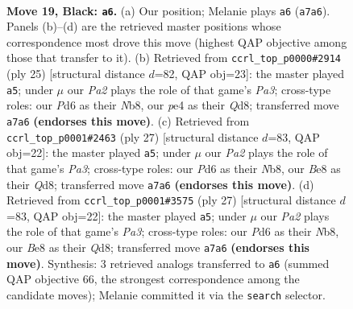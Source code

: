 \documentclass[11pt]{article}
\begin{document}
\clearpage

\begin{figure}[p]\centering
\begin{subfigure}{0.46\textwidth}\centering
\resizebox{\linewidth}{!}{%
\newchessgame
\chessboard[
  setfen={rn2b2r/ppq2kbp/3pp1p1/4p1Pn/4P3/2N1BP2/PPPK2QP/3RRB2 b - - 0 19},
  showmover=false,
  pgfstyle=straightmove, color=movearrow, markmove={a7-a6}
]}
\caption{}
\end{subfigure}\hfill
\begin{subfigure}{0.46\textwidth}\centering
\resizebox{\linewidth}{!}{%
\newchessgame
\chessboard[
  setfen={rn1q1rk1/1p2bpp1/p2p4/3Ppb1p/8/1N2BP2/PPPQB1PP/R4RK1 b - - 2 13},
  showmover=false,
  pgfstyle=straightmove, color=movearrow, markmove={a6-a5}
]}
\caption{}
\end{subfigure}
\\[4pt]
\begin{subfigure}{0.46\textwidth}\centering
\resizebox{\linewidth}{!}{%
\newchessgame
\chessboard[
  setfen={rn1qk2r/1p2bpp1/p2p4/3Ppb1p/8/1N2BPP1/PPPQB2P/2KR3R b kq - 2 14},
  showmover=false,
  pgfstyle=straightmove, color=movearrow, markmove={a6-a5}
]}
\caption{}
\end{subfigure}\hfill
\begin{subfigure}{0.46\textwidth}\centering
\resizebox{\linewidth}{!}{%
\newchessgame
\chessboard[
  setfen={rn1qk2r/1p2bpp1/p2p4/3Ppb1p/8/1N2BPP1/PPPQB2P/2KR3R b kq - 2 14},
  showmover=false,
  pgfstyle=straightmove, color=movearrow, markmove={a6-a5}
]}
\caption{}
\end{subfigure}
\caption{\textbf{Move 19, Black: \texttt{a6}.} (a) Our position; Melanie plays \texttt{a6} (\texttt{a7a6}). Panels (b)--(d) are the retrieved master positions whose correspondence most drove this move (highest QAP objective among those that transfer to it). (b) Retrieved from \texttt{ccrl\_top\_p0000\#2914} (ply 25) [structural distance $d$=82, QAP obj=23]: the master played \texttt{a5}; under $\mu$ our \emph{Pa2} plays the role of that game's \emph{Pa3}; cross-type roles: our \emph{P}d6 as their \emph{N}b8, our \emph{p}e4 as their \emph{Q}d8; transferred move \texttt{a7a6} \textbf{(endorses this move)}. (c) Retrieved from \texttt{ccrl\_top\_p0001\#2463} (ply 27) [structural distance $d$=83, QAP obj=22]: the master played \texttt{a5}; under $\mu$ our \emph{Pa2} plays the role of that game's \emph{Pa3}; cross-type roles: our \emph{P}d6 as their \emph{N}b8, our \emph{B}e8 as their \emph{Q}d8; transferred move \texttt{a7a6} \textbf{(endorses this move)}. (d) Retrieved from \texttt{ccrl\_top\_p0001\#3575} (ply 27) [structural distance $d$=83, QAP obj=22]: the master played \texttt{a5}; under $\mu$ our \emph{Pa2} plays the role of that game's \emph{Pa3}; cross-type roles: our \emph{P}d6 as their \emph{N}b8, our \emph{B}e8 as their \emph{Q}d8; transferred move \texttt{a7a6} \textbf{(endorses this move)}. Synthesis: 3 retrieved analogs transferred to \texttt{a6} (summed QAP objective 66, the strongest correspondence among the candidate moves); Melanie committed it via the \texttt{search} selector.}
\label{fig:thought-m37}
\end{figure}
\end{document}
